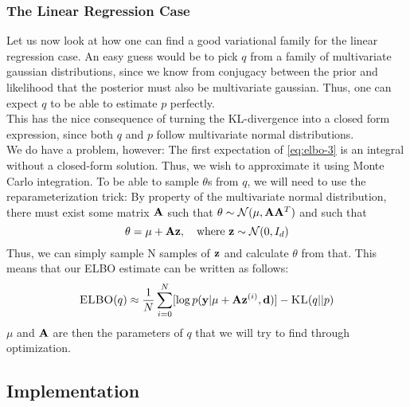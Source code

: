 \subsubsection{The Linear Regression Case}
Let us now look at how one can find a good variational family for the linear regression case.
An easy guess would be to pick $q$ from a family of multivariate gaussian distributions, since we know from conjugacy between the prior and likelihood that the posterior must also be multivariate gaussian.
Thus, one can expect $q$ to be able to estimate $p$ perfectly.\\
This has the nice consequence of turning the KL-divergence into a closed form expression, since both $q$ and $p$ follow multivariate normal distributions.\\
We do have a problem, however: The first expectation of \ref{eq:elbo-3} is an integral without a closed-form solution.
Thus, we wish to approximate it using Monte Carlo integration. 
To be able to sample $\theta$s from $q$, we will need to use the reparameterization trick:
By property of the multivariate normal distribution, there must exist some matrix $\mathbf{A}$ such that $\theta \sim \mathcal{N}(\mu, \mathbf{A} \mathbf{A}^T)$ \cite{krause22}
and such that
\begin{equation}\theta = \mu + \B{A}\B{z}, \quad \textrm{where}\ \B{z}\sim \mathcal{N}(0,I_d)\end{equation}
Thus, we can simply sample N samples of $\mathbf{z}$ and calculate $\theta$ from that. 
This means that our ELBO estimate can be written as follows:
\begin{equation}\textsc{ELBO}(q) \approx \frac{1}{N}\sum_{i=0}^N [\log p(\mathbf{y} | \mu + \mathbf{A}\mathbf{z}^{(i)}, \mathbf{d})] - \textsc{KL}(q || p)\end{equation}
$\mu$ and $\mathbf{A}$ are then the parameters of $q$ that we will try to find through optimization.
\subsection{Implementation}
